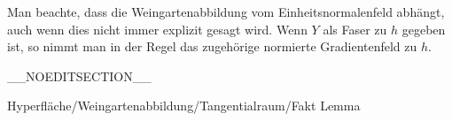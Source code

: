 Man beachte, dass die Weingartenabbildung vom Einheitsnormalenfeld abhängt, auch wenn dies nicht immer explizit gesagt wird. Wenn $Y$ als Faser zu $h$ gegeben ist, so nimmt man in der Regel das zugehörige normierte Gradientenfeld zu $h$.

__NOEDITSECTION__

{Hyperfläche/Weingartenabbildung/Tangentialraum/Fakt}
{Lemma}
{}
{

\faktzusatz {}
\faktzusatz {}

}
